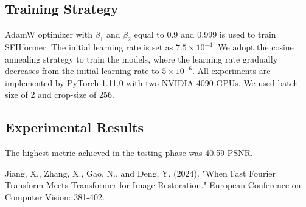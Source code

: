 \documentclass[10pt,twocolumn,letterpaper]{article}
\begin{document}
\subsection{Training Strategy}
AdamW optimizer with $\beta_1$ and $\beta_2$ equal to 0.9 and 0.999 is used to train SFHformer. The initial learning rate is set as $7.5 \times 10^{-4}$. We adopt the cosine annealing strategy to train the models, where the learning rate gradually decreases from the initial learning rate to $5 \times 10^{-6}$. All experiments are implemented by PyTorch 1.11.0 with two NVIDIA 4090 GPUs. We used batch-size of 2 and crop-size of 256.

\subsection{Experimental Results}
The highest metric achieved in the testing phase was 40.59 PSNR.


\begin{thebibliography}{00}
	
	Jiang, X., Zhang, X., Gao, N., and Deng, Y. (2024). "When Fast Fourier Transform Meets Transformer for Image Restoration." European Conference on Computer Vision: 381-402. 
\end{thebibliography}
\end{document}
